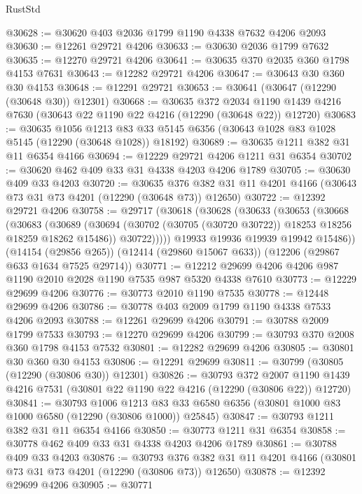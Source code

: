 \begin{lexlean}{RustStd}
\begin{coremodule}
{\begin{coremodule}
{{{{{{{{{{{{{{{{{{{{{{{{{{{{{{{{{{{{{{{{{{{{{{{{{{@30628 := @30620 @403 @2036 @1799 @1190 @4338 @7632 @4206 @2093
@30630 := @12261 @29721 @4206
@30633 := @30630 @2036 @1799 @7632
@30635 := @12270 @29721 @4206
@30641 := @30635 @370 @2035 @360 @1798 @4153 @7631
@30643 := @12282 @29721 @4206
@30647 := @30643 @30 @360 @30 @4153
@30648 := @12291 @29721
@30653 := @30641 (@30647 (@12290 (@30648 @30)) @12301)
@30668 := @30635
    @372
    @2034
    @1190
    @1439
    @4216
    @7630
    (@30643 @22 @1190 @22 @4216 (@12290 (@30648 @22)) @12720)
@30683 := @30635
    @1056
    @1213
    @83
    @33
    @5145
    @6356
    (@30643 @1028 @83 @1028 @5145 (@12290 (@30648 @1028)) @18192)
@30689 := @30635 @1211 @382 @31 @11 @6354 @4166
@30694 := @12229 @29721 @4206 @1211 @31 @6354
@30702 := @30620 @462 @409 @33 @31 @4338 @4203 @4206 @1789
@30705 := @30630 @409 @33 @4203
@30720 := @30635
    @376
    @382
    @31
    @11
    @4201
    @4166
    (@30643 @73 @31 @73 @4201 (@12290 (@30648 @73)) @12650)
@30722 := @12392 @29721 @4206
@30758 := @29717
    (@30618
      (@30628
        (@30633
          (@30653
            (@30668
              (@30683
                (@30689
                  (@30694 (@30702 (@30705 (@30720 @30722)) @18253 @18256 @18259 @18262 @15486))
                  @30722)))))
        @19933
        @19936
        @19939
        @19942
        @15486))
    (@14154 (@29856 @265))
    (@12414 (@29860 @15067 @633))
    (@12206 (@29867 @633 @1634 @7525 @29714))
@30771 := @12212 @29699 @4206 @4206 @987 @1190 @2010 @2028 @1190 @7535 @987 @5320 @4338 @7610
@30773 := @12229 @29699 @4206
@30776 := @30773 @2010 @1190 @7535
@30778 := @12448 @29699 @4206
@30786 := @30778 @403 @2009 @1799 @1190 @4338 @7533 @4206 @2093
@30788 := @12261 @29699 @4206
@30791 := @30788 @2009 @1799 @7533
@30793 := @12270 @29699 @4206
@30799 := @30793 @370 @2008 @360 @1798 @4153 @7532
@30801 := @12282 @29699 @4206
@30805 := @30801 @30 @360 @30 @4153
@30806 := @12291 @29699
@30811 := @30799 (@30805 (@12290 (@30806 @30)) @12301)
@30826 := @30793
    @372
    @2007
    @1190
    @1439
    @4216
    @7531
    (@30801 @22 @1190 @22 @4216 (@12290 (@30806 @22)) @12720)
@30841 := @30793
    @1006
    @1213
    @83
    @33
    @6580
    @6356
    (@30801 @1000 @83 @1000 @6580 (@12290 (@30806 @1000)) @25845)
@30847 := @30793 @1211 @382 @31 @11 @6354 @4166
@30850 := @30773 @1211 @31 @6354
@30858 := @30778 @462 @409 @33 @31 @4338 @4203 @4206 @1789
@30861 := @30788 @409 @33 @4203
@30876 := @30793
    @376
    @382
    @31
    @11
    @4201
    @4166
    (@30801 @73 @31 @73 @4201 (@12290 (@30806 @73)) @12650)
@30878 := @12392 @29699 @4206
@30905 := @30771
}}}}}}}}}}}}}}}}}}}}}}}}}}}}}}}}}}}}}}}}}}}}}}}}}}
\end{coremodule}}
\end{coremodule}
\end{lexlean}
